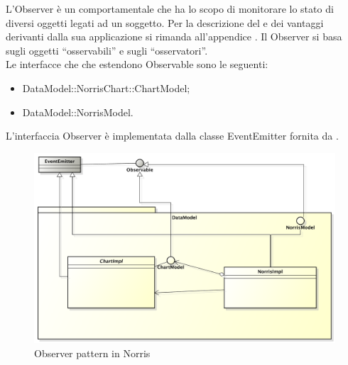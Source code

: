 			L'Observer è un  comportamentale che ha lo scopo di monitorare lo stato di diversi oggetti legati ad un soggetto.
			Per la descrizione del  e dei vantaggi derivanti dalla sua applicazione si rimanda all'appendice .
				Il  Observer si basa sugli oggetti “osservabili” e sugli “osservatori”.\\
				Le interfacce che che estendono Observable sono le seguenti:
				\begin{itemize}
					\item DataModel::NorrisChart::ChartModel;
					\item DataModel::NorrisModel.
				\end{itemize}
				L'interfaccia Observer è implementata dalla classe EventEmitter fornita da .
				\begin{figure}[H]\centering
	        		\includegraphics[width=\textwidth]{SpecificaTecnica/Pics/DesignPatternNorris/Observer}
	        		\caption{Observer pattern in Norris}
	    		\end{figure}
		
